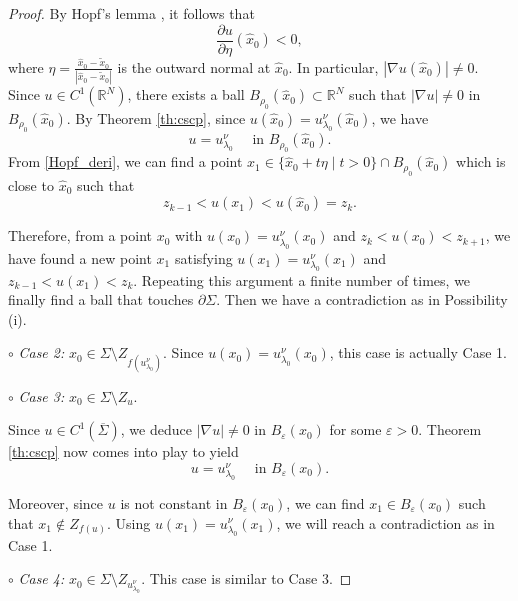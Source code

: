 \documentclass[reqno]{amsart}
\theoremstyle{plain}
\theoremstyle{definition}
\theoremstyle{remark}
\begin{document}
\begin{proof}
		By Hopf's lemma \cite{MR768629}, it follows that
		\begin{equation}\label{Hopf_deri}
			\frac{\partial u}{\partial\eta}(\hat x_0) < 0,
		\end{equation}
		where $\eta=\frac{\hat x_0 - \tilde x_0}{|\hat x_0 - \tilde x_0|}$ is the outward normal at $\hat x_0$. In particular, $|\nabla u(\hat x_0)|\ne0$. Since $u\in C^1(\mathbb{R}^N)$, there exists a ball $B_{\rho_0}(\hat x_0) \subset \mathbb{R}^N$ such that $|\nabla u|\ne0$ in $B_{\rho_0}(\hat x_0)$. By Theorem \ref{th:cscp}, since $u(\hat x_0) = u_{\lambda_0}^\nu(\hat x_0)$, we have
		\[
		u = u_{\lambda_0}^\nu \quad\text{ in } B_{\rho_0}(\hat x_0).
		\]
		From \eqref{Hopf_deri}, we can find a point $x_1 \in \{\hat x_0 + t \eta \mid t>0\} \cap B_{\rho_0}(\hat x_0)$ which is close to $\hat x_0$ such that
		\[
		z_{k-1} < u(x_1) < u(\hat x_0) = z_k.
		\]
		
		Therefore, from a point $x_0$ with $u(x_0) = u_{\lambda_0}^\nu(x_0)$ and $z_k < u(x_0) < z_{k+1}$, we have found a new point $x_1$ satisfying $u(x_1) = u_{\lambda_0}^\nu(x_1)$ and $z_{k-1} < u(x_1) < z_k$. Repeating this argument a finite number of times, we finally find a ball that touches $\partial\Sigma$. Then we have a contradiction as in Possibility (i).
		
		$\circ$ \textit{Case 2:} $x_0 \in \Sigma \setminus Z_{f(u_{\lambda_0}^\nu)}$. Since $u(x_0) = u_{\lambda_0}^\nu(x_0)$, this case is actually Case 1.
		
		$\circ$ \textit{Case 3:} $x_0 \in \Sigma \setminus Z_u$.
		
		Since $u \in C^1(\overline{\Sigma})$, we deduce $|\nabla u| \ne 0$ in $B_\varepsilon(x_0)$ for some $\varepsilon>0$. Theorem \ref{th:cscp} now comes into play to yield
		\[
		u = u_{\lambda_0}^\nu \quad\text{ in } B_\varepsilon(x_0).
		\]
		
		Moreover, since $u$ is not constant in $B_\varepsilon(x_0)$, we can find $x_1\in B_\varepsilon(x_0)$ such that $x_1\notin Z_{f(u)}$. Using $u(x_1) = u_{\lambda_0}^\nu(x_1)$, we will reach a contradiction as in Case 1.
		
		$\circ$ \textit{Case 4:} $x_0 \in \Sigma \setminus Z_{u_{\lambda_0}^\nu}$. This case is similar to Case 3.
	\end{proof}
	
\end{document}
